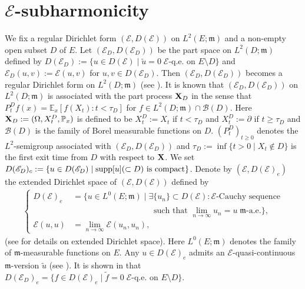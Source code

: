 \documentclass[12pt,a4paper]{article}
\newcommand{\m}{\mathfrak{m} }
\newcommand{\1}{{\bf 1}}
\begin{document}
\section{{$\mathscr{E}$}-subharmonicity}\label{sec3:subharmonicity}
We fix a regular Dirichlet form $(\mathscr{E},D(\mathscr{E}))$ on $L^2(E;{\m})$ and a non-empty 
open subset $D$ of $E$. Let $(\mathscr{E}_D,D(\mathscr{E}_D))$ be 
the part space on $L^2(D;{\m})$ defined by 
$D(\mathscr{E}_D):=\{u\in D(\mathscr{E})\mid \tilde{u}=0\; \mathscr{E}\text{-q.e.~on }E\setminus D\}$ and 
$\mathscr{E}_D(u,v):=\mathscr{E}(u,v)$ for $u,v\in D(\mathscr{E}_D)$. 
Then $(\mathscr{E}_D,D(\mathscr{E}_D))$ becomes a regular Dirichlet form on $L^2(D;\m)$ (see \cite[Theorem~4.4.3]{FOT}).
It is known that $(\mathscr{E}_D,D(\mathscr{E}_D))$ on $L^2(D;{\m})$ is associated with the part process ${\bf X}_D$ in the sense that 
$P_t^Df(x)=\mathbb{E}_x[f(X_t):t<\tau_D]$ for $f\in L^2(D;{\m})\cap \mathscr{B}(D)$. Here ${\bf X}_D:=(\Omega, X_t^D,\mathbb{P}_x)$ is defined to be 
$X_t^D:=X_t$ if $t<\tau_D$ and $X_t^D:=\partial$ if $t\geq\tau_D$ and  
$\mathscr{B}(D)$ is the family of Borel measurable functions on $D$.  
$(P_t^D)_{t\geq0}$ denotes the $L^2$-semigroup 
associated with $(\mathscr{E}_D,D(\mathscr{E}_D))$ and $\tau_D:=\inf\{t>0\mid X_t\notin D\}$ is the first exit time from $D$ with respect to ${\bf X}$. 
We set $D(\mathscr{E}_D)_c:=\{u\in D(\mathscr{E}_D)\mid {\rm supp}[u](\subset D)\text{ is compact}\}$. 
Denote by $(\mathscr{E},D(\mathscr{E})_e)$ the extended Dirichlet space of $(\mathscr{E},D(\mathscr{E}))$ defined by 
\begin{align*}
\left\{\begin{array}{rl}D(\mathscr{E})_e&=\{u\in L^0(E;{\m})\mid \exists \{u_n\}\subset D(\mathscr{E}): \mathscr{E}\text{-Cauchy sequence}\\
&\hspace{4cm}  \text{ such  that }\lim_{n\to\infty}u_n=u\;{\m}\text{-a.e.}\}, \\
\mathscr{E}(u,u)&=\lim_{n\to\infty}\mathscr{E}(u_n,u_n),\end{array}\right.
\end{align*}
(see \cite[p.~40]{FOT} for details on extended Dirichlet space). 
Here $L^0(E;{\m})$ denotes the family of ${\m}$-measurable functions on $E$. 
Any $u\in  D(\mathscr{E})_e$ admits an $\mathscr{E}$-quasi-continuous ${\m}$-version $\tilde{u}$ (see \cite[Theorem~2.1.7]{FOT}).
It is shown in \cite[Theorem~3.4.9]{CFbook} that $D(\mathscr{E}_D)_e=\{f\in D(\mathscr{E})_e\mid \tilde{f}=0\;\mathscr{E}\text{-q.e.~on }E\setminus D\}$.
\end{document}
